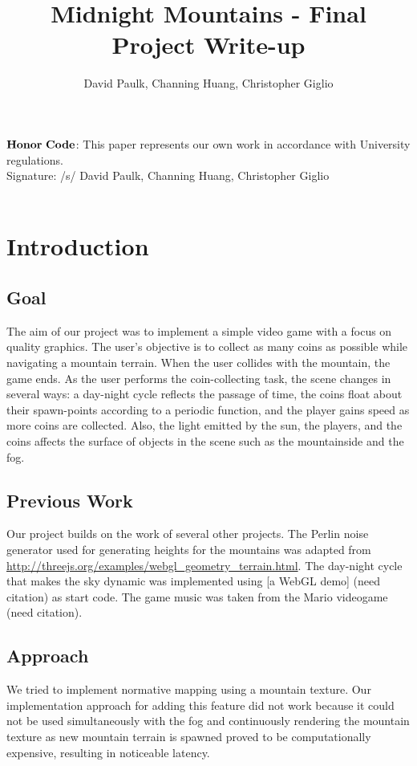 \documentclass{article}
\begin{document}
\title{Midnight Mountains - Final Project Write-up}
\author{David Paulk, Channing Huang, Christopher Giglio\\}
\date{}
\maketitle

\thispagestyle{empty}

\noindent 
$\bf{Honor \ Code}$: This paper represents our own work in accordance with University regulations.\\
Signature: /s/ David Paulk, Channing Huang, Christopher Giglio
\\ \\
\section{Introduction}
\subsection{Goal}
The aim of our project was to implement a simple video game with a focus on quality graphics.  The user's objective is to collect as many coins as possible while navigating a mountain terrain.  When the user collides with the mountain, the game ends.  As the user performs the coin-collecting task, the scene changes in several ways: a day-night cycle reflects the passage of time, the coins float about their spawn-points according to a periodic function, and the player gains speed as more coins are collected.  Also, the light emitted by the sun, the players, and the coins affects the surface of objects in the scene such as the mountainside and the fog.

\subsection{Previous Work}
Our project builds on the work of several other projects.  The Perlin noise generator used for generating heights for the mountains was adapted from \url{http://threejs.org/examples/webgl_geometry_terrain.html}.  The day-night cycle that makes the sky dynamic was implemented using [a WebGL demo] (need citation) as start code. The game music was taken from the Mario videogame (need citation).
 
\subsection{Approach}
We tried to implement normative mapping using a mountain texture.  Our implementation approach for adding this feature did not work because it could not be used simultaneously with the fog and continuously rendering the mountain texture as new mountain terrain is spawned proved to be computationally expensive, resulting in noticeable latency.
\end{document}
